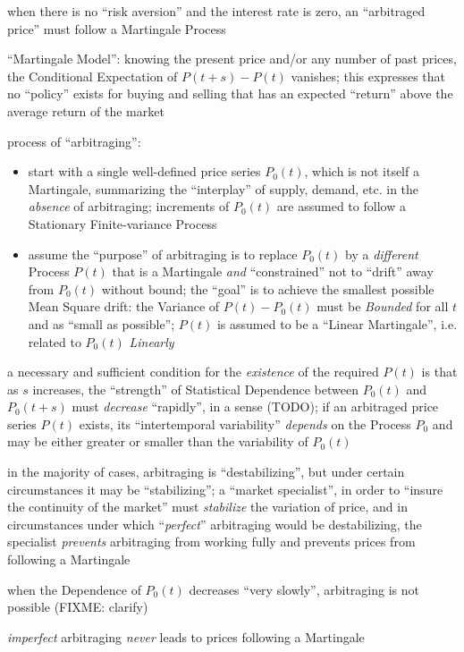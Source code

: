 when there is no ``risk aversion'' and the interest rate is zero, an
``arbitraged price'' must follow a Martingale Process

``Martingale Model'': knowing the present price and/or any number of past
prices, the Conditional Expectation of $P(t+s) - P(t)$ vanishes; this expresses
that no ``policy'' exists for buying and selling that has an expected ``return''
above the average return of the market

process of ``arbitraging'':
\begin{itemize}
  \item start with a single well-defined price series $P_0(t)$, which is not
    itself a Martingale, summarizing the ``interplay'' of supply, demand, etc.
    in the \emph{absence} of arbitraging; increments of $P_0(t)$ are assumed to
    follow a Stationary Finite-variance Process
  \item assume the ``purpose'' of arbitraging is to replace $P_0(t)$ by a
    \emph{different} Process $P(t)$ that is a Martingale \emph{and}
    ``constrained'' not to ``drift'' away from $P_0(t)$ without bound;
    the ``goal'' is to achieve the smallest possible Mean Square drift: the
    Variance of $P(t) - P_0(t)$ must be \emph{Bounded} for all $t$ and as
    ``small as possible''; $P(t)$ is assumed to be a ``Linear Martingale'',
    i.e. related to $P_0(t)$ \emph{Linearly}
\end{itemize}

a necessary and sufficient condition for the \emph{existence} of the required
$P(t)$ is that as $s$ increases, the ``strength'' of Statistical Dependence
between $P_0(t)$ and $P_0(t+s)$ must \emph{decrease} ``rapidly'', in a sense
(TODO); if an arbitraged price series $P(t)$ exists, its ``intertemporal
variability'' \emph{depends} on the Process $P_0$ and may be either greater or
smaller than the variability of $P_0(t)$

in the majority of cases, arbitraging is ``destabilizing'', but under certain
circumstances it may be ``stabilizing''; a ``market specialist'', in order to
``insure the continuity of the market'' must \emph{stabilize} the variation of
price, and in circumstances under which ``\emph{perfect}'' arbitraging would be
destabilizing, the specialist \emph{prevents} arbitraging from working fully and
prevents prices from following a Martingale

when the Dependence of $P_0(t)$ decreases ``very slowly'', arbitraging is not
possible (FIXME: clarify)

\emph{imperfect} arbitraging \emph{never} leads to prices following a Martingale

